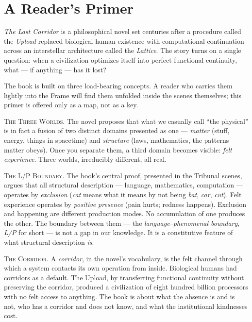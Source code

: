 \chapter*{A Reader's Primer}

\noindent
\textit{The Last Corridor} is a philosophical novel set centuries after a procedure called the \emph{Upload} replaced biological human existence with computational continuation across an interstellar architecture called the \emph{Lattice}. The story turns on a single question: when a civilization optimizes itself into perfect functional continuity, what — if anything — has it lost?

The book is built on three load-bearing concepts. A reader who carries them lightly into the Frame will find them unfolded inside the scenes themselves; this primer is offered only as a map, not as a key.

\bigskip

\noindent\textsc{The Three Worlds.}\enspace
The novel proposes that what we casually call \enquote{the physical} is in fact a fusion of two distinct domains presented as one — \emph{matter} (stuff, energy, things in spacetime) and \emph{structure} (laws, mathematics, the patterns matter obeys). Once you separate them, a third domain becomes visible: \emph{felt experience}. Three worlds, irreducibly different, all real.

\bigskip

\noindent\textsc{The L/P Boundary.}\enspace
The book's central proof, presented in the Tribunal scenes, argues that all structural description — language, mathematics, computation — operates by \emph{exclusion} (\emph{cat} means what it means by not being \emph{bat}, \emph{car}, \emph{cut}). Felt experience operates by \emph{positive presence} (pain hurts; redness happens). Exclusion and happening are different production modes. No accumulation of one produces the other. The boundary between them — the \emph{language–phenomenal boundary}, \emph{L/P} for short — is not a gap in our knowledge. It is a constitutive feature of what structural description \emph{is}.

\bigskip

\noindent\textsc{The Corridor.}\enspace
A \emph{corridor}, in the novel's vocabulary, is the felt channel through which a system contacts its own operation from inside. Biological humans had corridors as a default. The Upload, by transferring functional continuity without preserving the corridor, produced a civilization of eight hundred billion processors with no felt access to anything. The book is about what the absence is and is not, who has a corridor and does not know, and what the institutional kindnesses cost.

